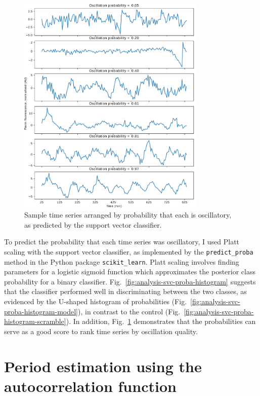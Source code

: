 \begin{figure}
  \centering
  \includegraphics[width=0.8\textwidth]{svm_3_edit.pdf}

  \caption{
    Sample time series arranged by probability that each is oscillatory, as predicted by the support vector classifier.
  }
  \label{fig:analysis-svc-proba-gallery}
\end{figure}

To predict the probability that each time series was oscillatory, I used Platt scaling  \parencite{plattProbabilisticOutputsSupport1999} with the support vector classifier, as implemented by the \texttt{predict\_proba} method in the Python package \texttt{scikit\_learn}.
Platt scaling involves finding parameters for a logistic sigmoid function which approximates the posterior class probability for a binary classifier.
Fig.\ \ref{fig:analysis-svc-proba-histogram} suggests that the classifier performed well in discriminating between the two classes, as evidenced by the U-shaped histogram of probabilities (Fig.\ \ref{fig:analysis-svc-proba-histogram-model}), in contrast to the control (Fig.\ \ref{fig:analysis-svc-proba-histogram-scramble}).
In addition, Fig.\ \ref{fig:analysis-svc-proba-gallery} demonstrates that the probabilities can serve as a good score to rank time series by oscillation quality.


\section{Period estimation using the autocorrelation function}
\label{sec:analysis-characterisation}

